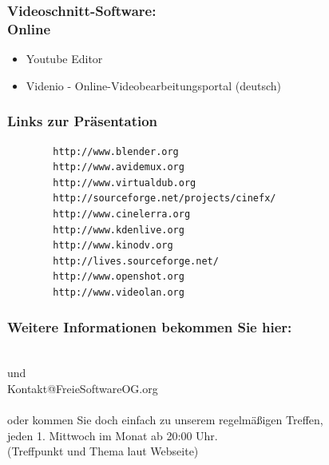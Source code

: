 \documentclass{beamer}
\begin{document}
 \begin{frame}

\frametitle{Videoschnitt-Software:\\Online}

\pause
 	
	\begin{itemize}
		\item Youtube Editor
		\item Videnio - Online-Videobearbeitungsportal (deutsch)
	\end{itemize}

\end{frame}

 \begin{frame}[fragile]		%
\frametitle{Links zur Präsentation}

	\begin{verbatim}
		http://www.blender.org
		http://www.avidemux.org
		http://www.virtualdub.org
		http://sourceforge.net/projects/cinefx/
		http://www.cinelerra.org
		http://www.kdenlive.org
		http://www.kinodv.org
		http://lives.sourceforge.net/
		http://www.openshot.org
		http://www.videolan.org
	\end{verbatim}
\end{frame}

{		%


\begin{frame}
\frametitle{Weitere Informationen bekommen Sie hier:}
	\begin{center}
	\Large{
		\fsog \\			%
		und \\
		Kontakt@FreieSoftwareOG.org \\~\\

		oder kommen Sie doch einfach zu unserem regelmäßigen Treffen, \\
		jeden 1. Mittwoch im Monat ab 20:00 Uhr. \\
		(Treffpunkt und Thema laut Webseite)
		}
	\end{center}
\end{frame}


}		%
\end{document}
